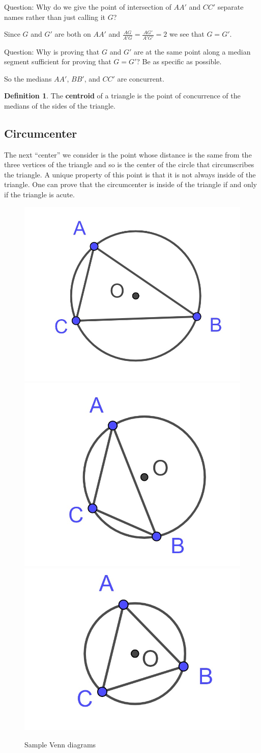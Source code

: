\documentclass[
]{book}
\theoremstyle{definition}
\newtheorem{definition}{Definition}[chapter]
\theoremstyle{definition}
\theoremstyle{definition}
\theoremstyle{definition}
\theoremstyle{remark}
\begin{document}
Question: Why do we give the point of intersection of \(AA'\) and \(CC'\) separate names rather than just calling it \(G\)?

Since \(G\) and \(G'\) are both on \(AA'\) and \(\frac{AG}{A'G} = \frac{AG'}{A'G'} = 2\) we see that \(G=G'\).

Question: Why is proving that \(G\) and \(G'\) are at the same point along a median segment sufficient for proving that \(G=G'\)? Be as specific as possible.

So the medians \(AA'\), \(BB'\), and \(CC'\) are concurrent.

\begin{definition}
The \textbf{centroid} of a triangle is the point of concurrence of the medians of the sides of the triangle.
\end{definition}

\hypertarget{circumcenter}{%
\subsection{Circumcenter}\label{circumcenter}}

The next ``center'' we consider is the point whose distance is the same from the three vertices of the triangle and so is the center of the circle that circumscribes the triangle. A unique property of this point is that it is not always inside of the triangle. One can prove that the circumcenter is inside of the triangle if and only if the triangle is acute.

\begin{figure}

{\centering \includegraphics[width=0.3\linewidth]{images/circumcenter2} \includegraphics[width=0.3\linewidth]{images/circumcenter3} \includegraphics[width=0.3\linewidth]{images/circumcenter4} 

}

\caption{Sample Venn diagrams}\label{fig:unnamed-chunk-133}
\end{figure}
\end{document}
